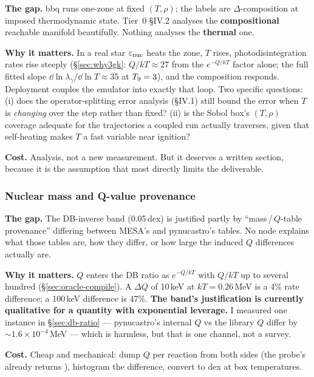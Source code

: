 \textbf{The gap.} bbq runs one-zone at fixed $(T, \rho)$; the labels are
$\Delta$-composition at imposed thermodynamic state. Tier~0 \S IV.2 analyses the
\textbf{compositional} reachable manifold beautifully. Nothing analyses the
\textbf{thermal} one.

\textbf{Why it matters.} In a real star $\varepsilon_{\rm nuc}$ heats the zone,
$T$ rises, photodisintegration rates rise steeply (\S\ref{sec:why3gk}:
$Q/kT \approx 27$ from the $e^{-Q/kT}$ factor alone; the full fitted slope
$\dd\ln\lambda_\gamma/\dd\ln T \approx 35$ at $T_{9} = 3$), and the composition
responds. Deployment couples the emulator into exactly that loop. Two specific
questions: (i) does the operator-splitting error analysis (\S IV.1) still bound
the error when $T$ is \emph{changing} over the step rather than fixed? (ii) is
the Sobol box's $(T, \rho)$ coverage adequate for the trajectories a coupled run
actually traverses, given that self-heating makes $T$ a fast variable near
ignition?

\textbf{Cost.} Analysis, not a new measurement. But it deserves a written
section, because it is the assumption that most directly limits the
deliverable.

\subsubsection{Nuclear mass and Q-value provenance}
\label{sec:gap-masses}

\textbf{The gap.} The DB-inverse band (0.05\,dex) is justified partly by
``mass\,/\,$Q$-table provenance'' differing between MESA's  and
pynucastro's tables. No node explains what those tables are, how they differ, or
how large the induced $Q$ differences actually are.

\textbf{Why it matters.} $Q$ enters the DB ratio as $e^{-Q/kT}$ with $Q/kT$ up
to several hundred (\S\ref{sec:oracle-compile}). A $\Delta Q$ of 10\,keV at
$kT = 0.26$\,MeV is a 4\% rate difference; a 100\,keV difference is 47\%.
\textbf{The band's justification is currently qualitative for a quantity with
exponential leverage.} I measured one instance in \S\ref{sec:db-ratio} ---
pynucastro's internal $Q$ vs the library $Q$ differ by
${\sim}1.6\times10^{-4}$\,MeV --- which is harmless, but that is one channel,
not a survey.

\textbf{Cost.} Cheap and mechanical: dump $Q$ per reaction from both sides (the
probe's  already returns ), histogram the difference,
convert to dex at box temperatures.


